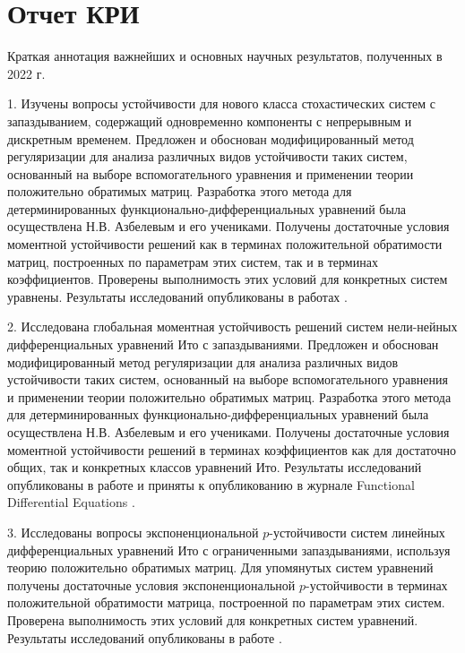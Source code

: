 \chapter{Отчет КРИ}

Краткая аннотация важнейших и основных научных результатов,
полученных в 2022 г.
\smallskip

1. Изучены вопросы устойчивости для  нового класса стохастических
систем с запаздыванием, содержащий одновременно компоненты с
непрерывным и дискретным временем. Предложен и обоснован
модифицированный метод регуляризации для анализа различных видов
устойчивости таких систем, основанный на выборе вспомогательного
уравнения и применении теории положительно обратимых матриц.
Разработка этого метода для детерминированных
функционально-дифференциальных уравнений была осуществлена Н.В.
Азбелевым и его учениками. Получены достаточные условия моментной
устойчивости решений как в терминах положительной обратимости
матриц, построенных по параметрам этих систем, так и в терминах
коэффициентов. Проверены выполнимость этих условий для конкретных
систем уравнены. Результаты исследований опубликованы в работах
\cite{kri-1,kri-2,kri-6}.


2. Исследована глобальная  моментная устойчивость решений систем
нели-нейных дифференциальных уравнений Ито с запаздываниями.
Предложен и обоснован модифицированный метод регуляризации для
анализа различных видов устойчивости таких систем, основанный на
выборе вспомогательного уравнения и применении теории положительно
обратимых матриц. Разработка этого метода для детерминированных
функционально-дифференциальных уравнений была осуществлена Н.В.
Азбелевым и его учениками. Получены достаточные условия моментной
устойчивости решений в терминах коэффициентов как для достаточно
общих, так и конкретных классов уравнений Ито. Результаты
исследований  опубликованы в работе \cite{kri-3} и приняты к опубликованию в
журнале  Functional Differential Equations \cite{kri-4}.
\smallskip

3. Исследованы вопросы  экспоненциональной $p$-устойчивости
систем линейных дифференциальных уравнений Ито с ограниченными
запаздываниями, используя теорию положительно обратимых матриц. Для
упомянутых систем уравнений получены достаточные условия
экспоненциональной $p$-устойчивости в терминах положительной
обратимости матрица, построенной по параметрам этих систем.
Проверена выполнимость этих условий для конкретных систем уравнений.
Результаты исследований опубликованы в работе \cite{kri-5}.
\smallskip


